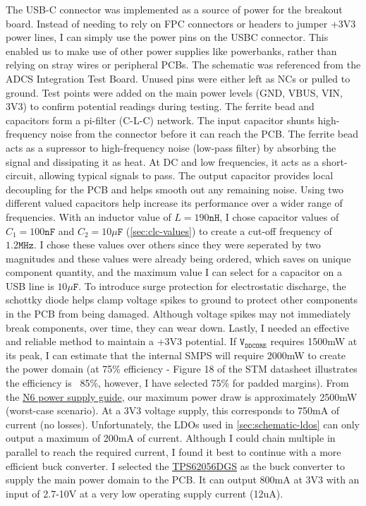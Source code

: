 The USB-C connector was implemented as a source of power for the breakout board. Instead of needing to rely on FPC connectors or headers to jumper +3V3 power lines, I can simply use the power pins on the USBC connector.
This enabled us to make use of other power supplies like powerbanks, rather than relying on stray wires or peripheral PCBs.
\nl
The schematic was referenced from the ADCS Integration Test Board. Unused pins were either left as NCs or pulled to ground.
Test points were added on the main power levels (GND, VBUS, VIN, 3V3) to confirm potential readings during testing.
\nl
The ferrite bead and capacitors form a pi-filter (C-L-C) network. The input capacitor shunts high-frequency noise from the connector before it can reach the PCB.
The ferrite bead acts as a supressor to high-frequency noise (low-pass filter) by absorbing the signal and dissipating it as heat. At DC and low frequencies, it acts as a short-circuit, allowing typical signals to pass.
The output capacitor provides local decoupling for the PCB and helps smooth out any remaining noise. Using two different valued capacitors help increase its performance over a wider range of frequencies.
With an inductor value of $L=190\texttt{nH}$, I chose capacitor values of $C_1=100\texttt{nF}$ and $C_2=10\mu\texttt{F}$ (\autoref{sec:clc-values}) to create a cut-off frequency of $1.2\texttt{MHz}$.
I chose these values over others since they were seperated by two magnitudes and these values were already being ordered, which saves on unique component quantity, and the maximum value I can select for a capacitor on a USB line is $10\mu\texttt{F}$.
\nl
To introduce surge protection for electrostatic discharge, the schottky diode helps clamp voltage spikes to ground to protect other components in the PCB from being damaged. Although voltage spikes may not immediately break components, over time, they can wear down.
\nl
Lastly, I needed an effective and reliable method to maintain a +3V3 potential. If $\texttt{V}_{\texttt{DDCORE}}$ requires 1500mW at its peak, I can estimate that the internal SMPS will require 2000mW to create the power domain (at 75\% efficiency - Figure 18 of the STM datasheet illustrates the efficiency is ~85\%, however, I have selected 75\% for padded margins).
From the \href{https://www.st.com/resource/en/application_note/an6000-how-to-build-the-discrete-power-supply-for-stm32n6-mcus-stmicroelectronics.pdf}{N6 power supply guide}, our maximum power draw is approximately 2500mW (worst-case scenario).
At a 3V3 voltage supply, this corresponds to 750mA of current (no losses). Unfortunately, the LDOs used in \autoref{sec:schematic-ldos} can only output a maximum of 200mA of current. Although I could chain multiple in parallel to reach the required current, I found it best to continue with a more efficient buck converter.
I selected the \href{https://au.mouser.com/ProductDetail/Texas-Instruments/TPS62056DGS?qs=sGAEpiMZZMvAX9OfPh%252B2NdYypUYwsctEmJ%252Bpz3ULnU8%3D}{TPS62056DGS} as the buck converter to supply the main power domain to the PCB. It can output 800mA at 3V3 with an input of 2.7-10V at a very low operating supply current (12uA).
